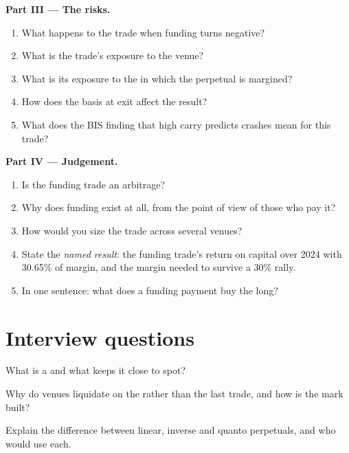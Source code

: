 \begin{problem}
\medskip\noindent\textbf{Part III --- The risks.}
\begin{enumerate}[resume]
\item What happens to the trade when funding turns negative?
\item What is the trade's exposure to the venue?
\item What is its exposure to the  in which the perpetual is margined?
\item How does the basis at exit affect the result?
\item What does the BIS finding that high carry predicts crashes mean for this trade?
\end{enumerate}

\medskip\noindent\textbf{Part IV --- Judgement.}
\begin{enumerate}[resume]
\item Is the funding trade an arbitrage?
\item Why does funding exist at all, from the point of view of those who pay it?
\item How would you size the trade across several venues?
\item State the \emph{named result}: the funding trade's return on capital over 2024 with 30.65\% of margin, and the
margin needed to survive a 30\% rally.
\item In one sentence: what does a funding payment buy the long?
\end{enumerate}
\end{problem}

\section{Interview questions}

\begin{interviewq}\label{iq:m3:perpetual-futures:1}
What is a  and what keeps it close to spot?
\end{interviewq}

\begin{interviewq}\label{iq:m3:perpetual-futures:2}
Why do venues liquidate on the  rather than the last trade, and how is the mark built?
\end{interviewq}

\begin{interviewq}\label{iq:m3:perpetual-futures:3}
Explain the difference between linear, inverse and quanto perpetuals, and who would use each.
\end{interviewq}

